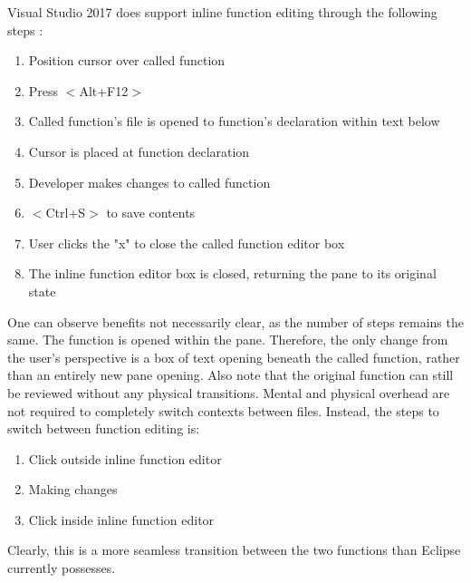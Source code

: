 \documentclass[]{report}
\begin{document}
		Visual Studio 2017 does support inline function editing through the following steps \citep{vsDownload}:

			\begin{enumerate}
				\item
				Position cursor over called function
				
				\item 
				Press $<$Alt+F12$>$
				
				\item
				Called function's file is opened to function's declaration within text below
				
				\item
				Cursor is placed at function declaration
				
				\item 
				Developer makes changes to called function
				
				\item
				$<$Ctrl+S$>$ to save contents
		
				\item 
				User clicks the "x" to close the called function editor box
			
				\item 
				The inline function editor box is closed, returning the pane to its original state
			\end{enumerate}
		
		One can observe benefits not necessarily clear, as the number of steps remains the same.  The function is opened within the pane.  Therefore, the only change from the user's perspective is a box of text opening beneath the called function, rather than an entirely new pane opening.  Also note that the original function can still be reviewed without any physical transitions.  Mental and physical overhead are not required to completely switch contexts between files.  Instead, the steps to switch between function editing is:
		
			\begin{enumerate}
				\item 
				Click outside inline function editor
				
				\item
				Making changes
				
				\item 
				Click inside inline function editor
			\end{enumerate}
		
		Clearly, this is a more seamless transition between the two functions than Eclipse currently possesses.
		
\end{document}
